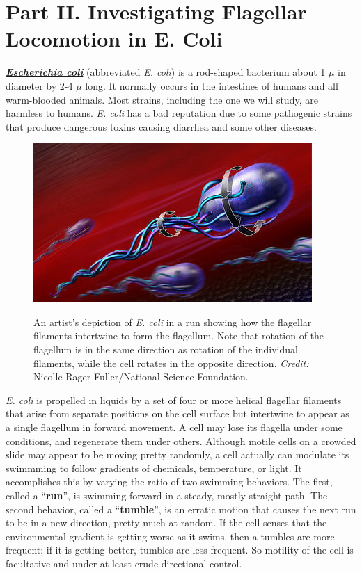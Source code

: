 \documentclass{../lab}
\begin{document}
\section{Part II. Investigating Flagellar Locomotion in E. Coli}

\emph{\href{http://en.wikipedia.org/wiki/Escherichia\_coli}{\textbf{Escherichia coli}}} (abbreviated \emph{E. coli}) is a rod-shaped bacterium about 1 $\mu$ in diameter by 2-4 $\mu$ long. It normally occurs in the intestines of humans and all warm-blooded animals. Most strains, including the one we will study, are harmless to humans. \emph{E. coli} has a bad reputation due to some pathogenic strains that produce dangerous toxins causing diarrhea and some other diseases.

\begin{figure}[h]
    \centering
    \href{http://experimentationlab.berkeley.edu/sites/default/files/images/400px-Ecoli800.jpg}{\includegraphics[width=0.5\linewidth]{images/400px-Ecoli800.jpg}}
    \caption{An artist's depiction of \emph{E. coli} in a run showing how the flagellar filaments intertwine to form the flagellum. Note that rotation of the flagellum is in the same direction as rotation of the individual filaments, while the cell rotates in the opposite direction. \emph{Credit:} Nicolle Rager Fuller/National Science Foundation.}
    \label{fig:400px-Ecoli800}
\end{figure}

\emph{E. coli} is propelled in liquids by a set of four or more helical flagellar filaments that arise from separate positions on the cell surface but intertwine to appear as a single flagellum in forward movement. A cell may lose its flagella under some conditions, and regenerate them under others. Although motile cells on a crowded slide may appear to be moving pretty randomly, a cell actually can modulate its swimmming to follow gradients of chemicals, temperature, or light. It accomplishes this by varying the ratio of two swimming behaviors. The first, called a ``\textbf{run}'', is swimming forward in a steady, mostly straight path. The second behavior, called a ``\textbf{tumble}'', is an erratic motion that causes the next run to be in a new direction, pretty much at random. If the cell senses that the environmental gradient is getting worse as it swims, then a tumbles are more frequent; if it is getting better, tumbles are less frequent. So motility of the cell is facultative and under at least crude directional control.
\end{document}
